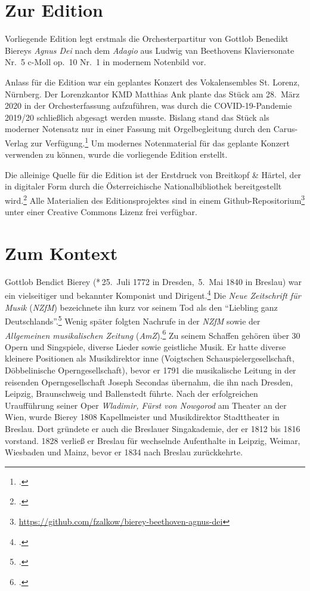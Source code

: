 \documentclass[paper=A3,12pt]{scrartcl}
\begin{document}
\thispagestyle{empty}

\section{Zur Edition}

Vorliegende Edition legt erstmals die Orchesterpartitur von Gottlob Benedikt Biereys \textit{Agnus Dei} nach dem \textit{Adagio} aus Ludwig van Beethovens Klaviersonate Nr.~5 c-Moll op.~10 Nr.~1 in modernem Notenbild vor.\medskip

Anlass für die Edition war ein geplantes Konzert des Vokalensembles St. Lorenz, Nürnberg.
Der Lorenzkantor KMD Matthias Ank plante das Stück am 28.\ März 2020 in der Orchesterfassung aufzuführen, was durch die COVID-19-Pandemie 2019/20 schließlich abgesagt werden musste.
Bislang stand das Stück als moderner Notensatz nur in einer Fassung mit Orgelbegleitung durch den Carus-Verlag zur Verfügung.\footcite{2018_Schumacher_AgnusDei_Carus}
Um modernes Notenmaterial für das geplante Konzert verwenden zu können, wurde die vorliegende Edition erstellt.\medskip

Die alleinige Quelle für die Edition ist der Erstdruck von Breitkopf \& Härtel, der in digitaler Form durch die Österreichische Nationalbibliothek bereitgestellt wird.\footcite{Bierey_AgnusDei_Breitkopf}
Alle Materialien des Editionsprojektes sind in einem Github-Repositorium\footnote{\url{https://github.com/fzalkow/bierey-beethoven-agnus-dei}} unter einer Creative Commons Lizenz frei verfügbar.

\section{Zum Kontext}

Gottlob Bendict Bierey (*\,25.\ Juli 1772 in Dresden, \textdagger\,5.\ Mai 1840 in Breslau)
war ein vielseitiger und bekannter Komponist und Dirigent.\footcite{2016_Haertwig_Bierey_MGG}
Die \textit{Neue Zeitschrift für Musik} (\textit{NZfM}) bezeichnete ihn kurz vor seinem Tod als den \enquote{Liebling ganz Deutschlands}.\footcite{1840_NA_Nachkommenschaft_NZFM}
Wenig später folgten Nachrufe in der \textit{NZfM} sowie der \textit{Allgemeinen musikalischen Zeitung} (\textit{AmZ}).\footcite{1840_NA_BiereyNachruf_NZFM,1840_NA_BiereyNachruf_AMZ}
Zu seinem Schaffen gehören über 30 Opern und Singspiele, diverse Lieder sowie geistliche Musik.
%
Er hatte diverse kleinere Positionen als Musikdirektor inne (Voigtschen Schauspielergesellschaft, Döbbelinische Operngesellschaft),
bevor er 1791 die musikalische Leitung in der reisenden Operngesellschaft Joseph Secondas übernahm, die ihn nach Dresden, Leipzig, Braunschweig und Ballenstedt führte.
Nach der erfolgreichen Uraufführung seiner Oper \textit{Wladimir, Fürst von Nowgorod} am Theater an der Wien, wurde Bierey 1808  Kapellmeister und Musikdirektor Stadttheater in Breslau.
Dort gründete er auch die Breslauer Singakademie, der er 1812 bis 1816 vorstand.
1828 verließ er Breslau für wechselnde Aufenthalte in Leipzig, Weimar, Wiesbaden und Mainz, bevor er 1834 nach Breslau zurückkehrte.
\end{document}
